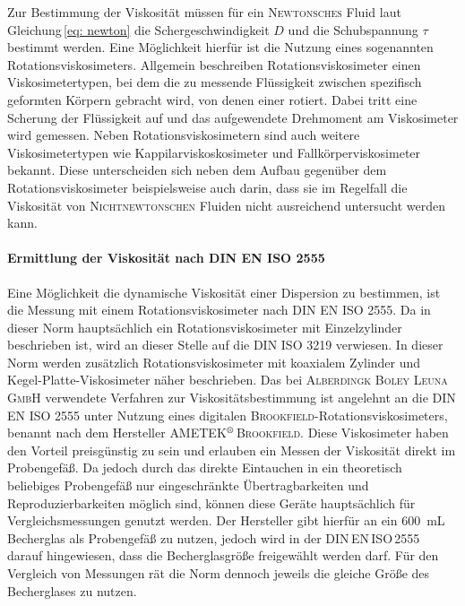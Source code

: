 Zur Bestimmung der Viskosität müssen für ein \textsc{Newtonsches} Fluid laut Gleichung\,\eqref{eq: newton} die Schergeschwindigkeit $D$ und die Schubspannung $\tau$ bestimmt werden. Eine Möglichkeit hierfür ist die Nutzung eines sogenannten Rotationsviskosimeters. Allgemein beschreiben Rotationsviskosimeter einen Viskosimetertypen, bei dem die zu messende Flüssigkeit zwischen spezifisch geformten Körpern gebracht wird, von denen einer rotiert. Dabei tritt eine Scherung der Flüssigkeit auf und das aufgewendete Drehmoment am Viskosimeter wird gemessen. Neben Rotationsviskosimetern sind auch weitere Viskosimetertypen wie Kappilarviskoskosimeter und Fallkörperviskosimeter bekannt. Diese unterscheiden sich neben dem Aufbau gegenüber dem Rotationsviskosimeter beispielsweise auch darin, dass sie im Regelfall die Viskosität von \textsc{Nichtnewtonschen} Fluiden nicht ausreichend untersucht werden kann. \cite{ROMPPRedaktion.2008}

\paragraph{Ermittlung der Viskosität nach DIN EN ISO 2555}
Eine Möglichkeit die dynamische Viskosität einer Dispersion zu bestimmen, ist die Messung mit einem Rotationsviskosimeter nach DIN EN ISO 2555. Da in dieser Norm hauptsächlich ein Rotationsviskosimeter mit Einzelzylinder beschrieben ist, wird an dieser Stelle auf die DIN ISO 3219 verwiesen. In dieser Norm werden zusätzlich Rotationsviskosimeter mit koaxialem Zylinder und Kegel-Platte-Viskosimeter näher beschrieben. \cite{DINDeutschesInstitutfurNormunge.V..Februar2013, DINDeutschesInstitutfurNormunge.V..September2018} \linebreak
Das bei \textsc{Alberdingk Boley Leuna GmbH} verwendete Verfahren zur Viskositätsbestimmung ist angelehnt an die DIN EN ISO 2555 unter Nutzung eines digitalen \textsc{Brookfield}-Rotationsviskosimeters, benannt nach dem Hersteller \textsc{AMETEK$^\text{\textregistered}$\,Brookfield}. Diese Viskosimeter haben den Vorteil preisgünstig zu sein und erlauben ein Messen der Viskosität direkt im Probengefäß. Da jedoch durch das direkte Eintauchen in ein theoretisch beliebiges Probengefäß nur eingeschränkte Übertragbarkeiten und Reproduzierbarkeiten möglich sind, können diese Geräte hauptsächlich für Vergleichsmessungen genutzt werden.  Der Hersteller gibt hierfür an ein \SI{600}{\milli \liter} Becherglas als Probengefäß zu nutzen, jedoch wird in der DIN\,EN\,ISO\,2555 darauf hingewiesen, dass die Becherglasgröße freigewählt werden darf. Für den Vergleich von Messungen rät die Norm dennoch jeweils die gleiche Größe des Becherglases zu nutzen. \cite{ROMPPRedaktion.2008, brookfield.2007, DINDeutschesInstitutfurNormunge.V..September2018}

